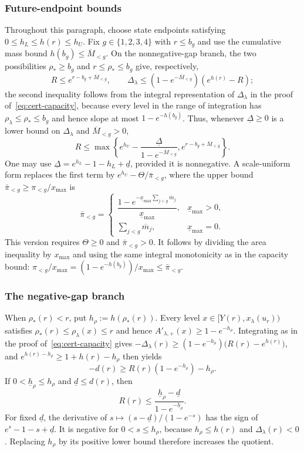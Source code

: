 \documentclass[11pt]{article}
\theoremstyle{definition}
\theoremstyle{remark}
\begin{document}
\subsubsection{Future-endpoint bounds}
Throughout this paragraph, choose state endpoints satisfying
$0\le h_L\le h(r)\le h_U$.
Fix $g\in\{1,2,3,4\}$ with $r\le b_g$ and use the cumulative
mass bound $h(b_g)\le\overline M_{<g}$.
On the nonnegative-gap branch, the two possibilities
$\rho_*\ge b_g$ and $r\le\rho_*\le b_g$ give, respectively,
\[
 R\le e^{r-b_g+\overline M_{<g}},\qquad
 \Delta_\lambda\le(1-e^{-\overline M_{<g}})(e^{h(r)}-R);
\]
the second inequality follows from the integral representation of $\Delta_\lambda$ in the
proof of~\eqref{eq:cert-capacity}, because every level in the range of integration has
$\rho_\lambda\le\rho_*\le b_g$ and hence slope at most $1-e^{-h(b_g)}$.
Thus, whenever $\underline\Delta\ge0$ is a lower bound on
$\Delta_\lambda$ and $\overline M_{<g}>0$,
\begin{equation}\label{eq:cert-future-endpoint}
 R\le\max\left\{e^{h_U}-\frac{\underline\Delta}{1-e^{-\overline M_{<g}}},
                       e^{r-b_g+\overline M_{<g}}\right\}.
\end{equation}
One may use
$\underline\Delta=e^{h_L}-1-h_L+\underline d$, provided it is nonnegative.
A scale-uniform form replaces the first term by $e^{h_U}-\Theta/\bar\pi_{<g}$,
where the upper bound $\bar\pi_{<g}\ge\pi_{<g}/x_{\max}$ is
\[
 \bar\pi_{<g}=\begin{cases}
 \dfrac{1-e^{-\underline{x}_{\max}\sum_{j<g}\overline m_j}}
       {\underline{x}_{\max}},&\underline{x}_{\max}>0,\\[2mm]
 \sum_{j<g}\overline m_j,&\underline{x}_{\max}=0.
 \end{cases}
\]
This version requires $\Theta\ge0$ and $\bar\pi_{<g}>0$.
It follows by dividing the area inequality by $x_{\max}$ and using the
same integral monotonicity as in the capacity bound: $\pi_{<g}/x_{\max}=(1-e^{-h(b_g)})/x_{\max}\le\bar\pi_{<g}$.

\subsubsection{The negative-gap branch}
When $\rho_*(r)<r$, put $h_\rho:=h(\rho_*(r))$.
Every level $x\in[Y(r),x_\lambda(u_r))$ satisfies $\rho_*(r)\le\rho_\lambda(x)\le r$
and hence $A'_{\lambda,+}(x)\ge1-e^{-h_\rho}$. Integrating as in the proof
of~\eqref{eq:cert-capacity} gives
$-\Delta_\lambda(r)\ge(1-e^{-h_\rho})\bigl(R(r)-e^{h(r)}\bigr)$, and $e^{h(r)-h_\rho}\ge1+h(r)-h_\rho$
then yields
\[
 -d(r)\ge R(r)(1-e^{-h_\rho})-h_\rho.
\]
If $0<\underline h_\rho\le h_\rho$ and $\underline d\le d(r)$, then
\begin{equation}\label{eq:cert-negative-inverse}
 R(r)\le\frac{\underline h_\rho-\underline d}{1-e^{-\underline h_\rho}}.
\end{equation}
For fixed $\underline d$, the derivative of $s\mapsto(s-\underline d)/(1-e^{-s})$ has the sign of $e^s-1-s+\underline d$.
It is negative for $0<s\le h_\rho$, because
$h_\rho\le h(r)$ and $\Delta_\lambda(r)<0$.
Replacing $h_\rho$ by its positive lower bound therefore increases the
quotient.
\end{document}
